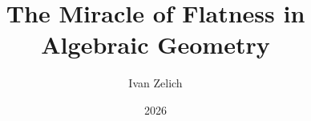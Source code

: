 \title{The Miracle of Flatness in Algebraic Geometry}
\author{Ivan Zelich}
\renewcommand{\maketitlehookc}{\vspace*{\fill}\centering Submitted in partial fulfillment of the \\
requirements for the degree of\\
Doctor of Philosophy\\
in the Graduate School of Arts and Sciences\\
\vspace{1cm}
Columbia University}
\date{2026}
\setlength{\droptitle}{1in}
